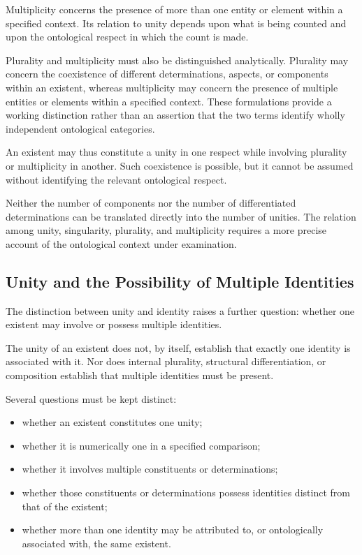 Multiplicity concerns the presence
of more than one entity or element
within a specified context. Its
relation to unity depends upon
what is being counted and upon
the ontological respect in which
the count is made.

Plurality and multiplicity must
also be distinguished analytically.
Plurality may concern the coexistence
of different determinations, aspects,
or components within an existent,
whereas multiplicity may concern
the presence of multiple entities
or elements within a specified
context. These formulations provide
a working distinction rather than
an assertion that the two terms
identify wholly independent
ontological categories.

An existent may thus constitute
a unity in one respect while
involving plurality or multiplicity
in another. Such coexistence is
possible, but it cannot be assumed
without identifying the relevant
ontological respect.

Neither the number of components
nor the number of differentiated
determinations can be translated
directly into the number of unities.
The relation among unity, singularity,
plurality, and multiplicity requires
a more precise account of the
ontological context under examination.

\subsection{Unity and the Possibility of Multiple Identities}

The distinction between unity and
identity raises a further question:
whether one existent may involve
or possess multiple identities.

The unity of an existent does not,
by itself, establish that exactly
one identity is associated with it.
Nor does internal plurality, structural
differentiation, or composition
establish that multiple identities
must be present.

Several questions must be kept
distinct:

\begin{itemize}
    \item whether an existent constitutes
    one unity;
    \item whether it is numerically
    one in a specified comparison;
    \item whether it involves multiple
    constituents or determinations;
    \item whether those constituents
    or determinations possess identities
    distinct from that of the existent;
    \item whether more than one identity
    may be attributed to, or ontologically
    associated with, the same existent.
\end{itemize}

